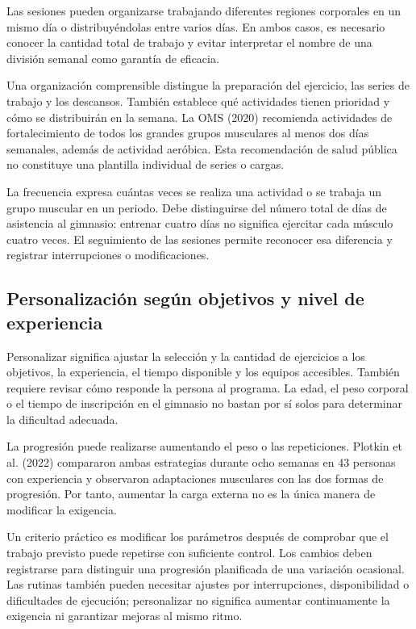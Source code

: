 Las sesiones pueden organizarse trabajando diferentes regiones corporales en un mismo día o distribuyéndolas entre varios días. En ambos casos, es necesario conocer la cantidad total de trabajo y evitar interpretar el nombre de una división semanal como garantía de eficacia.

Una organización comprensible distingue la preparación del ejercicio, las series de trabajo y los descansos. También establece qué actividades tienen prioridad y cómo se distribuirán en la semana. La OMS (2020) recomienda actividades de fortalecimiento de todos los grandes grupos musculares al menos dos días semanales, además de actividad aeróbica. Esta recomendación de salud pública no constituye una plantilla individual de series o cargas.

La frecuencia expresa cuántas veces se realiza una actividad o se trabaja un grupo muscular en un periodo. Debe distinguirse del número total de días de asistencia al gimnasio: entrenar cuatro días no significa ejercitar cada músculo cuatro veces. El seguimiento de las sesiones permite reconocer esa diferencia y registrar interrupciones o modificaciones.

\subsection{Personalización según objetivos y nivel de experiencia}

Personalizar significa ajustar la selección y la cantidad de ejercicios a los objetivos, la experiencia, el tiempo disponible y los equipos accesibles. También requiere revisar cómo responde la persona al programa. La edad, el peso corporal o el tiempo de inscripción en el gimnasio no bastan por sí solos para determinar la dificultad adecuada.

La progresión puede realizarse aumentando el peso o las repeticiones. Plotkin et al. (2022) compararon ambas estrategias durante ocho semanas en 43 personas con experiencia y observaron adaptaciones musculares con las dos formas de progresión. Por tanto, aumentar la carga externa no es la única manera de modificar la exigencia.

Un criterio práctico es modificar los parámetros después de comprobar que el trabajo previsto puede repetirse con suficiente control. Los cambios deben registrarse para distinguir una progresión planificada de una variación ocasional. Las rutinas también pueden necesitar ajustes por interrupciones, disponibilidad o dificultades de ejecución; personalizar no significa aumentar continuamente la exigencia ni garantizar mejoras al mismo ritmo.

